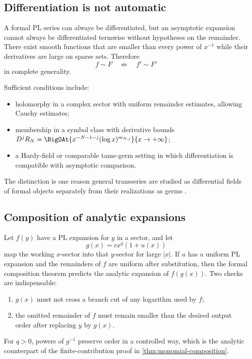 \documentclass[11pt,oneside]{article}
\numberwithin{equation}{section}
\theoremstyle{definition}
\newcommand{\as}{\sim}
\begin{document}
\subsection{Differentiation is not automatic}

A formal PL series can always be differentiated, but an asymptotic expansion
cannot always be differentiated termwise without hypotheses on the remainder.
There exist smooth functions that are smaller than every power of \(x^{-1}\)
while their derivatives are large on sparse sets.  Therefore
\[
  f\as F\quad\not\Longrightarrow\quad f'\as F'
\]
in complete generality.

Sufficient conditions include:
\begin{itemize}
\item holomorphy in a complex sector with uniform remainder estimates, allowing
  Cauchy estimates;
\item membership in a symbol class with derivative bounds
  \(D^jR_N=\BigOAt{x^{-N-1-j}(\log x)^{m_{N,j}}}{x\to+\infty}\);
\item a Hardy-field or comparable tame-germ setting in which differentiation is
  compatible with asymptotic comparison.
\end{itemize}
The distinction is one reason general transseries are studied as differential
fields of formal objects separately from their realizations as germs
\cite{VanDerHoeven2006,ADHTransseries}.

\subsection{Composition of analytic expansions}

Let \(f(y)\) have a PL expansion for \(y\) in a sector, and let
\[
  g(x)=cx^q(1+u(x))
\]
map the working \(x\)-sector into that \(y\)-sector for large \(|x|\).  If
\(u\) has a uniform PL expansion and the remainders of \(f\) are uniform after
substitution, then the formal composition theorem predicts the analytic
expansion of \(f(g(x))\).  Two checks are indispensable:
\begin{enumerate}
\item \(g(x)\) must not cross a branch cut of any logarithm used by \(f\);
\item the omitted remainder of \(f\) must remain smaller than the desired output
  order after replacing \(y\) by \(g(x)\).
\end{enumerate}
For \(q>0\), powers of \(g^{-1}\) preserve order in a controlled way, which is
the analytic counterpart of the finite-contribution proof in
\cref{thm:monomial-composition}.
\end{document}
